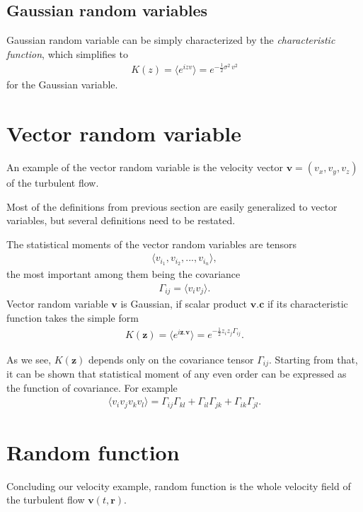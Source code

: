 \subsection{Gaussian random variables}
Gaussian random variable can be simply characterized by the \textit{characteristic function}, which simplifies to
\begin{align*}
K(z) = \langle e^{izv} \rangle = e^{-\frac{1}{2} \sigma^2 \, v^2}
\end{align*}
for the Gaussian variable.

\section{Vector random variable}
An example of the vector random variable is the velocity vector $\bm{v} = (v_x,v_y,v_z)$ of the turbulent flow.

Most of the definitions from previous section are easily generalized to vector variables, but several definitions need to be restated.

The statistical moments of the vector random variables are tensors
\begin{align}
\langle v_{i_1}, v_{i_2}, ..., v_{i_n} \rangle,
\end{align}
the most important among them being the covariance
\begin{align}
\Gamma_{ij} = \langle v_i v_j \rangle.
\end{align}
\bigskip
Vector random variable $\bm{v}$ is Gaussian, if scalar product $\bm{v}.\bm{c}$ if its characteristic function takes the simple form
\begin{align}
K(\bm{z}) = \langle e^{i\bm{z}.\bm{v}} \rangle = e^{-\frac{1}{2} z_i z_j \Gamma_{ij}}.
\end{align}

As we see, $K(\bm{z})$ depends only on the covariance tensor $\Gamma_{ij}$.
Starting from that, it can be shown that statistical moment of any even order can be expressed as the function of covariance. For example
\begin{align}
\langle v_i v_j v_k v_l \rangle = \Gamma_{ij}\Gamma_{kl} + \Gamma_{il}\Gamma_{jk} + \Gamma_{ik}\Gamma_{jl}.
\end{align}

\section{Random function}
Concluding our velocity example, random function is the whole velocity field of the turbulent flow
$\bm{v}(t,\bm{r})$.

